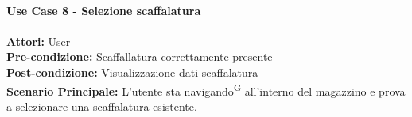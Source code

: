 \Large\textbf{}\\
\Large\textbf{Use Case 8 - Selezione scaffalatura} \\
\vspace{0.5cm}
\large\textbf{} \\
\textbf{Attori:} User\\
\textbf{Pre-condizione:} Scaffallatura correttamente presente \\
\textbf{Post-condizione: } Visualizzazione dati scaffalatura\\
\textbf{Scenario Principale:}  L'utente sta navigando\textsuperscript{G} all'interno del magazzino e prova a selezionare una scaffalatura esistente. \\
\vspace{0.5cm}
